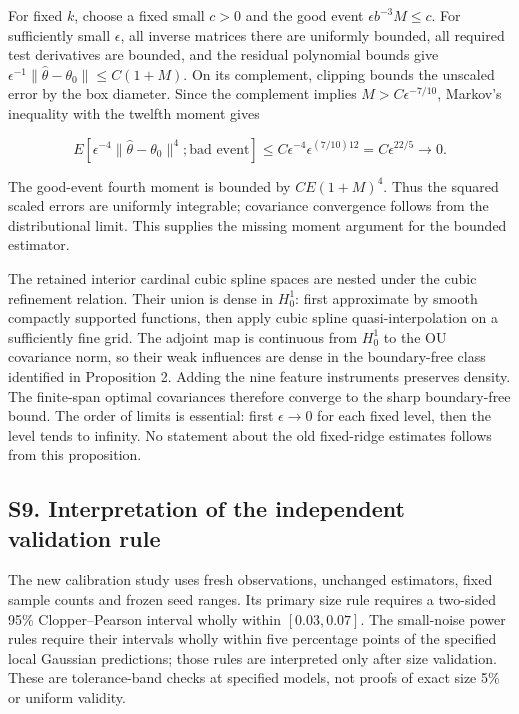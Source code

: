 \documentclass[
  american,
  11pt,
]{article}
\begin{document}
For fixed \(k\), choose a fixed small \(c>0\) and the good event
\(\epsilon b^{-3}M\leq c\). For sufficiently small \(\epsilon\), all
inverse matrices there are uniformly bounded, all required test
derivatives are bounded, and the residual polynomial bounds give
\(\epsilon^{-1}\|\widehat\theta-\theta_0\|\leq C(1+M)\). On its
complement, clipping bounds the unscaled error by the box diameter.
Since the complement implies \(M>C\epsilon^{-7/10}\), Markov's
inequality with the twelfth moment gives

\[
E[\epsilon^{-4}\|\widehat\theta-\theta_0\|^4;
\text{bad event}]\leq C\epsilon^{-4}\epsilon^{(7/10)12}
=C\epsilon^{22/5}\to0.
\]

The good-event fourth moment is bounded by \(C E(1+M)^4\). Thus the
squared scaled errors are uniformly integrable; covariance convergence
follows from the distributional limit. This supplies the missing moment
argument for the bounded estimator.

The retained interior cardinal cubic spline spaces are nested under the
cubic refinement relation. Their union is dense in \(H_0^1\): first
approximate by smooth compactly supported functions, then apply cubic
spline quasi-interpolation on a sufficiently fine grid. The adjoint map
is continuous from \(H_0^1\) to the OU covariance norm, so their weak
influences are dense in the boundary-free class identified in
Proposition 2. Adding the nine feature instruments preserves density.
The finite-span optimal covariances therefore converge to the sharp
boundary-free bound. The order of limits is essential: first
\(\epsilon\to0\) for each fixed level, then the level tends to infinity.
No statement about the old fixed-ridge estimates follows from this
proposition.

\subsection{S9. Interpretation of the independent validation
rule}\label{s9.-interpretation-of-the-independent-validation-rule}

The new calibration study uses fresh observations, unchanged estimators,
fixed sample counts and frozen seed ranges. Its primary size rule
requires a two-sided 95\% Clopper--Pearson interval wholly within
\([0.03,0.07]\). The small-noise power rules require their intervals
wholly within five percentage points of the specified local Gaussian
predictions; those rules are interpreted only after size validation.
These are tolerance-band checks at specified models, not proofs of exact
size 5\% or uniform validity.
\end{document}
